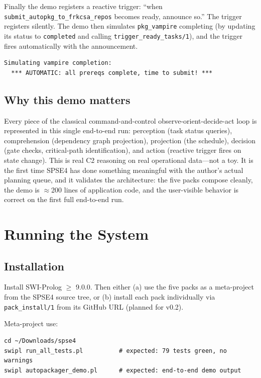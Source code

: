 \documentclass[11pt,letterpaper]{article}
\begin{document}
Finally the demo registers a reactive trigger: ``when
\texttt{submit\_autopkg\_to\_frkcsa\_repos} becomes ready, announce so.'' The
trigger registers silently. The demo then simulates \texttt{pkg\_vampire}
completing (by updating its status to \texttt{completed} and calling
\texttt{trigger\_ready\_tasks/1}), and the trigger fires automatically
with the announcement.

\begin{lstlisting}
Simulating vampire completion:
  *** AUTOMATIC: all prereqs complete, time to submit! ***
\end{lstlisting}

\subsection{Why this demo matters}

Every piece of the classical command-and-control
observe-orient-decide-act loop is represented in this single end-to-end
run: perception (task status queries), comprehension (dependency graph
projection), projection (the schedule), decision (gate checks,
critical-path identification), and action (reactive trigger fires on
state change). This is real C2 reasoning on real operational data---not a
toy. It is the first time SPSE4 has done something meaningful with the
author's actual planning queue, and it validates the architecture: the
five packs compose cleanly, the demo is $\approx$200 lines of application
code, and the user-visible behavior is correct on the first full
end-to-end run.

\section{Running the System}

\subsection{Installation}

Install SWI-Prolog $\geq$ 9.0.0. Then either (a) use the five packs as a
meta-project from the SPSE4 source tree, or (b) install each pack
individually via \texttt{pack\_install/1} from its GitHub URL (planned for
v0.2).

Meta-project use:

\begin{lstlisting}
cd ~/Downloads/spse4
swipl run_all_tests.pl          # expected: 79 tests green, no warnings
swipl autopackager_demo.pl      # expected: end-to-end demo output
\end{lstlisting}
\end{document}
